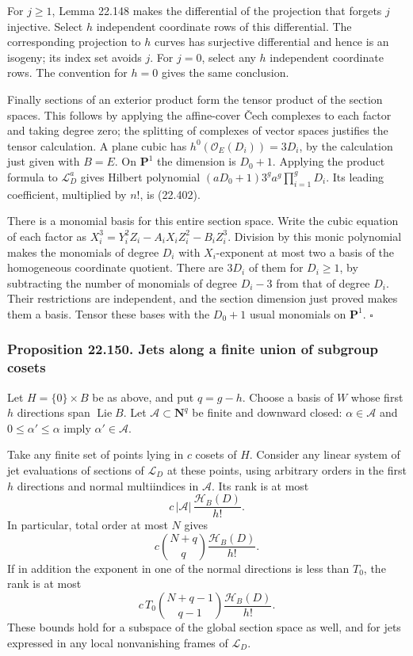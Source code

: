 \documentclass[
  11pt,
  a4paper,
]{article}
\begin{document}
For \(j\ge1\), Lemma 22.148 makes the differential of the projection
that forgets \(j\) injective. Select \(h\) independent coordinate rows
of this differential. The corresponding projection to \(h\) curves has
surjective differential and hence is an isogeny; its index set avoids
\(j\). For \(j=0\), select any \(h\) independent coordinate rows. The
convention for \(h=0\) gives the same conclusion.

Finally sections of an exterior product form the tensor product of the
section spaces. This follows by applying the affine-cover Čech complexes
to each factor and taking degree zero; the splitting of complexes of
vector spaces justifies the tensor calculation. A plane cubic has
\(h^0(\mathcal O_E(D_i))=3D_i\), by the calculation just given with
\(B=E\). On \(\mathbf P^1\) the dimension is \(D_0+1\). Applying the
product formula to \(\mathcal L_D^a\) gives Hilbert polynomial
\((aD_0+1)3^g a^g\prod_{i=1}^gD_i\). Its leading coefficient, multiplied
by \(n!\), is (22.402).

There is a monomial basis for this entire section space. Write the cubic
equation of each factor as \(X_i^3=Y_i^2Z_i-A_iX_iZ_i^2-B_iZ_i^3\).
Division by this monic polynomial makes the monomials of degree \(D_i\)
with \(X_i\)-exponent at most two a basis of the homogeneous coordinate
quotient. There are \(3D_i\) of them for \(D_i\ge1\), by subtracting the
number of monomials of degree \(D_i-3\) from that of degree \(D_i\).
Their restrictions are independent, and the section dimension just
proved makes them a basis. Tensor these bases with the \(D_0+1\) usual
monomials on \(\mathbf P^1\). \(\square\)

\subsubsection{Proposition 22.150. Jets along a finite union of subgroup
cosets}\label{proposition-22.150.-jets-along-a-finite-union-of-subgroup-cosets}

Let \(H=\{0\}\times B\) be as above, and put \(q=g-h\). Choose a basis
of \(W\) whose first \(h\) directions span \(\operatorname{Lie}B\). Let
\(\mathcal A\subset\mathbf N^q\) be finite and downward closed:
\(\alpha\in\mathcal A\) and \(0\le\alpha'\le\alpha\) imply
\(\alpha'\in\mathcal A\).

Take any finite set of points lying in \(c\) cosets of \(H\). Consider
any linear system of jet evaluations of sections of \(\mathcal L_D\) at
these points, using arbitrary orders in the first \(h\) directions and
normal multiindices in \(\mathcal A\). Its rank is at most \[
 c\,|\mathcal A|\,\frac{\mathcal H_B(D)}{h!}.
 \tag{22.404}
\] In particular, total order at most \(N\) gives \[
 c\binom{N+q}{q}\frac{\mathcal H_B(D)}{h!}.
 \tag{22.405}
\] If in addition the exponent in one of the normal directions is less
than \(T_0\), the rank is at most \[
 c\,T_0\binom{N+q-1}{q-1}\frac{\mathcal H_B(D)}{h!}.
 \tag{22.406}
\] These bounds hold for a subspace of the global section space as well,
and for jets expressed in any local nonvanishing frames of
\(\mathcal L_D\).
\end{document}
